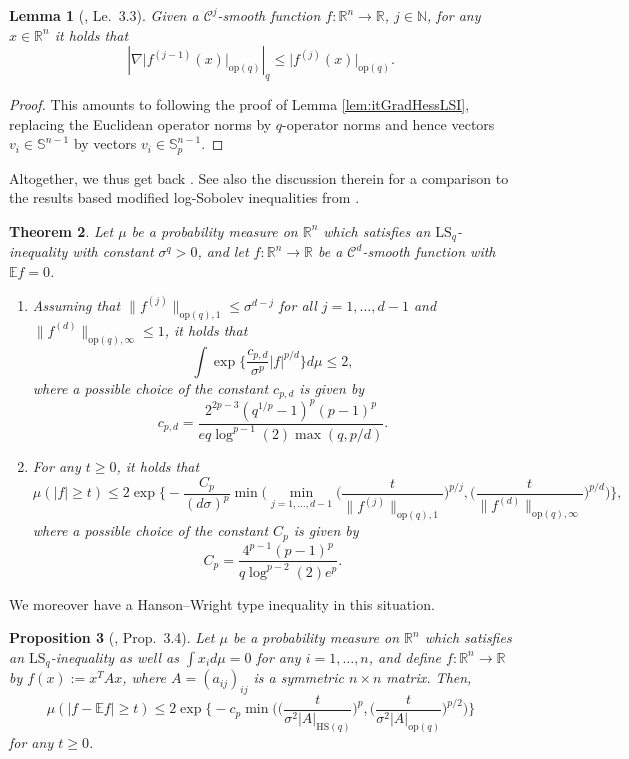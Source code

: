 \documentclass[a4paper,12pt]{amsart}
\numberwithin{equation}{section}
\newtheorem{satz}{Theorem}[section]
\newtheorem{proposition}[satz]{Proposition}
\newtheorem{lemma}[satz]{Lemma}
\theoremstyle{remark}
\def\E{{\mathbb E}}
\def\R{{\mathbb R}}
\def\S{{\mathbb S}}
\begin{document}
\begin{lemma}[\cite{GS24}, Le.\ 3.3]
	\label{lem:itGradHessLSq}
	Given a $\mathcal{C}^j$-smooth function $f \colon \R^n \to \mathbb{R}$, $j \in \mathbb{N}$, for any $x \in \R^n$ it holds that
	\[
	|\nabla \lvert f^{(j-1)}(x) \rvert_{\mathrm{op}(q)}|_q \le 
	\lvert f^{(j)}(x) \rvert_{\mathrm{op}(q)}.
	\]
\end{lemma}

\begin{proof}
	This amounts to following the proof of Lemma \ref{lem:itGradHessLSI}, replacing the Euclidean operator norms by $q$-operator norms and hence vectors $v_i \in \S^{n-1}$ by vectors $v_i \in \S_p^{n-1}$.
\end{proof}

Altogether, we thus get back \cite[Th.\ 3.2]{GS24}. See also the discussion therein for a comparison to the results based modified log-Sobolev inequalities from \cite{ALM18}.

\begin{satz}\label{thm:HigherOrderLSq}
	Let $\mu$ be a probability measure on $\R^n$ which satisfies an $\mathrm{LS}_q$-inequality with constant $\sigma^q > 0$, and let $f\colon \R^n \to \R$ be a $\mathcal{C}^d$-smooth function with $\E f = 0$.
	\begin{enumerate}
		\item Assuming that $\lVert f^{(j)} \rVert_{\mathrm{op}(q),1} \le \sigma^{d-j}$ for all $j=1,\ldots,d-1$ and $\lVert f^{(d)} \rVert_{\mathrm{op}(q),\infty} \le 1$, it holds that
		\[
		\int \exp\Big\{\frac{c_{p,d}}{\sigma^p} |f|^{p/d} \Big\} d\mu \le 2,
		\]
		where a possible choice of the constant $c_{p,d}$ is given by
		\[
		c_{p,d} = \frac{2^{2p-3}(q^{1/p}-1)^p(p-1)^p}{eq \log^{p-1}(2)\max(q, p/d)}.
		\]
		\item For any $t\ge 0$, it holds that
		\[
		\mu(|f| \ge t)\le
		2 \exp\Big\{- \frac{C_p}{(d\sigma)^p} \min\Big(\min_{j=1, \ldots,d-1} \Big(\frac{t}{\lVert f^{(j)} \rVert_{\mathrm{op}(q),1}}\Big)^{p/j}, \Big(\frac{t}{\lVert f^{(d)} \rVert_{\mathrm{op}(q),\infty}}\Big)^{p/d}\Big)\Big\},
		\]
		where a possible choice of the constant $C_p$ is given by
		\[
		C_p = \frac{4^{p-1}(p-1)^p}{q\log^{p-2}(2) e^p}.
		\]
	\end{enumerate}
\end{satz}

We moreover have a Hanson--Wright type inequality in this situation.

\begin{proposition}[\cite{GS24}, Prop.\ 3.4]\label{prop:HWILSq}
    Let $\mu$ be a probability measure on $\R^n$ which satisfies an $\mathrm{LS}_q$-inequality as well as $\int x_i d\mu = 0$ for any $i=1, \ldots,n$, and define $f\colon \R^n \to \R$ by $f(x) := x^TAx$, where $A=(a_{ij})_{ij}$ is a symmetric $n \times n$ matrix. Then,
    \[
    \mu(|f - \E f| \ge t) \le 2\exp\Big\{-c_p\min \Big(\Big(\frac{t}{\sigma^2\lvert A \rvert_{\mathrm{HS}(q)}}\Big)^p, \Big(\frac{t}{\sigma^2\lvert A \rvert_{\mathrm{op}(q)}}\Big)^{p/2}\Big)\Big\}
    \]
    for any $t \ge 0$.
\end{proposition}
\end{document}
